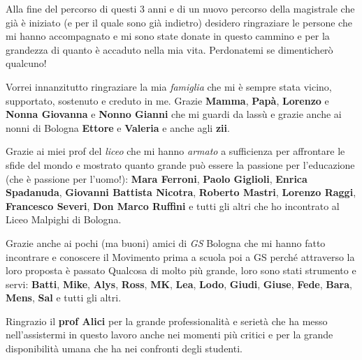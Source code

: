Alla fine del percorso di questi 3 anni e di un nuovo percorso della magistrale che già è iniziato (e per il quale sono già indietro) desidero ringraziare le persone che mi hanno accompagnato e mi sono state donate in questo cammino e per la grandezza di quanto è accaduto nella mia vita. Perdonatemi se dimenticherò qualcuno!

Vorrei innanzitutto ringraziare la mia \textit{famiglia} che mi è sempre stata vicino, supportato, sostenuto e creduto in me. Grazie \textbf{Mamma}, \textbf{Papà}, \textbf{Lorenzo} e \textbf{Nonna Giovanna} e \textbf{Nonno Gianni} che mi guardi da lassù e grazie anche ai nonni di Bologna \textbf{Ettore} e \textbf{Valeria} e anche agli \textbf{zii}.

Grazie ai miei prof del \textit{liceo} che mi hanno \textit{armato} a sufficienza per affrontare le sfide del mondo e mostrato quanto grande può essere la passione per l'educazione (che è passione per l'uomo!): \textbf{Mara Ferroni}, \textbf{Paolo Giglioli}, \textbf{Enrica Spadanuda}, \textbf{Giovanni Battista Nicotra}, \textbf{Roberto Mastri}, \textbf{Lorenzo Raggi}, \textbf{Francesco Severi}, \textbf{Don Marco Ruffini} e tutti gli altri che ho incontrato al Liceo Malpighi di Bologna.

Grazie anche ai pochi (ma buoni) amici di \textit{GS} Bologna che mi hanno fatto incontrare e conoscere il Movimento prima a scuola poi a GS perché attraverso la loro proposta è passato Qualcosa di molto più grande, loro sono stati strumento e servi: \textbf{Batti}, \textbf{Mike}, \textbf{Alys}, \textbf{Ross}, \textbf{MK}, \textbf{Lea}, \textbf{Lodo}, \textbf{Giudi}, \textbf{Giuse}, \textbf{Fede}, \textbf{Bara}, \textbf{Mens}, \textbf{Sal} e tutti gli altri.

Ringrazio il \textbf{prof Alici} per la grande professionalità e serietà che ha messo nell'assistermi in questo lavoro anche nei momenti più critici e per la grande disponibilità umana che ha nei confronti degli studenti.

